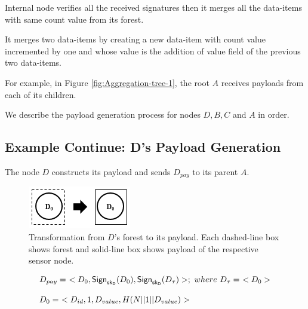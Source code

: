 \documentclass[%
  slidesonly,%
  semlayer%
  ]{seminar}                                  %
\newcommand{\sk}{\sf{sk}}
\begin{document}
\begin{slide}
      Internal node verifies all the received signatures then it merges all the data-items with same count value from its forest.

      It merges two data-items by creating a new data-item with count value incremented by one and whose value is the addition of value field of the previous two data-items. 

      For example, in Figure \ref{fig:Aggregation-tree-1}, the root $A$ receives payloads from each of its children.
        
      We describe the payload generation process for nodes $D,B,C$ and $A$ in order.
      \vfill
      \clearpage

    \vfill%
    \clearpage

    \subsection*{Example Continue: D's Payload Generation}
      The node $D$ constructs its payload and sends $D_{pay}$ to its parent $A$.
      
      \begin{figure}[h!]
        \centering
        \includegraphics[scale = 0.5]{images/d-forest-payload.png}
        \caption{Transformation from $D$'s forest to its payload.
            Each dashed-line box shows forest and solid-line box shows payload of the respective sensor node.}
        \label{fig:d-forest-payload}
      \end{figure}
      \begin{equation*}
        \begin{array}{l}
          D_{pay} =\ <D_{0}, \textsf{Sign}_{\sk_{D}}(D_{0}), \textsf{Sign}_{\sk_{D}}(D_{\tau})>;\ where\ D_{\tau} =\ <D_{0}>\\
          \\
          D_{0} =\ <D_{id},1,D_{value},H(N||1||D_{value})>
        \end{array}
      \end{equation*}


      \vfill
      \clearpage


\end{slide}
\end{document}
